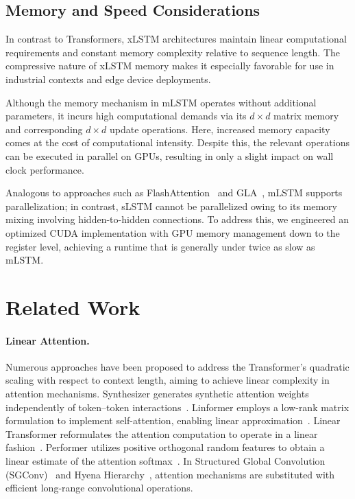 \subsection{Memory and Speed Considerations}

In contrast to Transformers, xLSTM architectures maintain linear computational requirements and constant memory complexity relative to sequence length. The compressive nature of xLSTM memory makes it especially favorable for use in industrial contexts and edge device deployments.

Although the memory mechanism in mLSTM operates without additional parameters, it incurs high computational demands via its $d \times d$ matrix memory and corresponding $d \times d$ update operations. Here, increased memory capacity comes at the cost of computational intensity. Despite this, the relevant operations can be executed in parallel on GPUs, resulting in only a slight impact on wall clock performance.

Analogous to approaches such as FlashAttention~\citep{Dao:22,Dao:23} and GLA~\citep{Yang:23arxiv}, mLSTM supports parallelization; in contrast, sLSTM cannot be parallelized owing to its memory mixing involving hidden-to-hidden connections. To address this, we engineered an optimized CUDA implementation with GPU memory management down to the register level, achieving a runtime that is generally under twice as slow as mLSTM.

\section{Related Work}
\label{sec:related}

\paragraph{Linear Attention.} Numerous approaches have been proposed to address the Transformer’s quadratic scaling with respect to context length, aiming to achieve linear complexity in attention mechanisms. Synthesizer generates synthetic attention weights independently of token--token interactions~\citep{Tay:20arxiv}. Linformer employs a low-rank matrix formulation to implement self-attention, enabling linear approximation~\citep{Wang:20arxiv}. Linear Transformer reformulates the attention computation to operate in a linear fashion~\citep{Katharopoulos:20}. Performer utilizes positive orthogonal random features to obtain a linear estimate of the attention softmax~\citep{Choromanski:21}. In Structured Global Convolution (SGConv)~\citep{Li:22} and Hyena Hierarchy~\citep{Poli:23}, attention mechanisms are substituted with efficient long-range convolutional operations.

